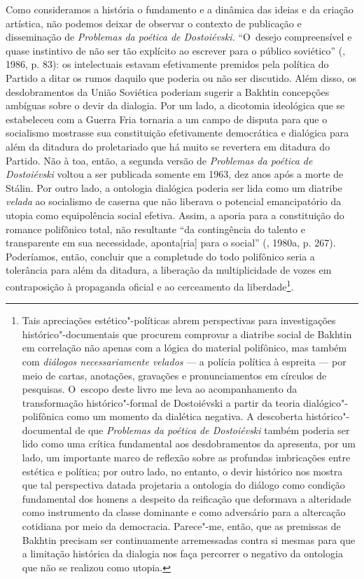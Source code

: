 Como consideramos a história o fundamento e a dinâmica das ideias e da
criação artística, não podemos deixar de observar o contexto de
publicação e disseminação de \emph{Problemas da poética de Dostoiévski.}
``O~desejo compreensível e quase instintivo de não ser tão explícito ao
escrever para o público soviético'' (, 1986, p. 83): os
intelectuais estavam efetivamente premidos pela política do Partido a
ditar os rumos daquilo que poderia ou não ser discutido. Além disso, os
desdobramentos da União Soviética poderiam sugerir a Bakhtin concepções
ambíguas sobre o devir da dialogia. Por um lado, a dicotomia ideológica
que se estabeleceu com a Guerra Fria tornaria a  um campo de disputa
para que o socialismo mostrasse sua constituição efetivamente
democrática e dialógica para além da ditadura do proletariado que há
muito se revertera em ditadura do Partido. Não à toa, então, a segunda
versão de \emph{Problemas da poética de Dostoiévski} voltou a ser
publicada somente em 1963, dez anos após a morte de Stálin. Por outro
lado, a ontologia dialógica poderia ser lida como um diatribe
\emph{velada} ao socialismo de caserna que não liberava o potencial
emancipatório da utopia como equipolência social efetiva. Assim, a
aporia para a constituição do romance polifônico total, não resultante
``da contingência do talento e transparente em sua necessidade,
aponta{[}ria{]} para o social'' (, 1980a, p. 267). Poderíamos,
então, concluir que a completude do todo polifônico seria a tolerância
para além da ditadura, a liberação da multiplicidade de vozes em
contraposição à propaganda oficial e ao cerceamento da
liberdade\footnote{Tais apreciações estético"-políticas abrem
  perspectivas para investigações histórico"-documentais que procurem
  comprovar a diatribe social de Bakhtin em correlação não apenas com a
  lógica do material polifônico, mas também com \emph{diálogos
  necessariamente velados} --- a polícia política à espreita --- por meio
  de cartas, anotações, gravações e pronunciamentos em círculos de
  pesquisas. O~escopo deste livro me leva ao acompanhamento da
  transformação histórico"-formal de Dostoiévski a partir da teoria
  dialógico"-polifônica como um momento da dialética negativa. A
  descoberta histórico"-documental de que \emph{Problemas da poética de
  Dostoiévski} também poderia ser lido como uma crítica fundamental aos
  desdobramentos da  apresenta, por um lado, um importante marco de
  reflexão sobre as profundas imbricações entre estética e política; por
  outro lado, no entanto, o devir histórico nos mostra que tal
  perspectiva datada projetaria a ontologia do diálogo como condição
  fundamental dos homens a despeito da reificação que deformava a
  alteridade como instrumento da classe dominante e como adversário para
  a altercação cotidiana por meio da democracia. Parece"-me, então, que
  as premissas de Bakhtin precisam ser continuamente arremessadas contra
  si mesmas para que a limitação histórica da dialogia nos faça
  percorrer o negativo da ontologia que não se realizou como utopia.}.

